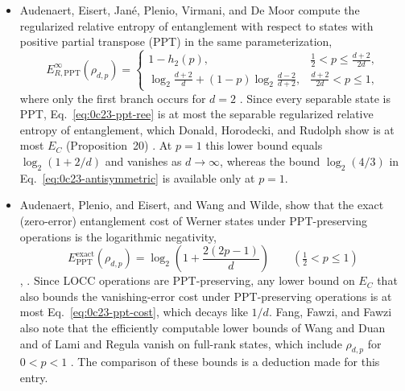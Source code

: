 \begin{itemize}
  \item Audenaert, Eisert, Jan\'e, Plenio, Virmani, and De Moor compute the
  regularized relative entropy of entanglement with respect to states with
  positive partial transpose (PPT) in the same parameterization,
  \begin{equation}
    E_{R,\mathrm{PPT}}^\infty(\rho_{d,p})=
    \begin{cases}
      1-h_2(p), & \frac12<p\leq\frac{d+2}{2d},\\[4pt]
      \log_2\frac{d+2}{d}+(1-p)\log_2\frac{d-2}{d+2},
        & \frac{d+2}{2d}<p\leq1,
    \end{cases}
    \label{eq:0c23-ppt-ree}
  \end{equation}
  where only the first branch occurs for $d=2$
  .  Since every separable state is
  PPT, Eq.~\eqref{eq:0c23-ppt-ree} is at most the separable regularized
  relative entropy of entanglement, which Donald, Horodecki, and Rudolph show
  is at most $E_C$ (Proposition~20)
  .  At $p=1$ this lower
  bound equals $\log_2(1+2/d)$ and vanishes as $d\to\infty$, whereas the bound
  $\log_2(4/3)$ in Eq.~\eqref{eq:0c23-antisymmetric} is available only at
  $p=1$.

  \item Audenaert, Plenio, and Eisert, and Wang and Wilde, show that the exact
  (zero-error) entanglement cost of Werner states under PPT-preserving
  operations is the logarithmic negativity,
  \begin{equation}
    E_{\mathrm{PPT}}^{\mathrm{exact}}(\rho_{d,p})
    =\log_2\!\left(1+\frac{2(2p-1)}{d}\right)
    \qquad\left(\tfrac12<p\leq1\right)
    \label{eq:0c23-ppt-cost}
  \end{equation}
  ,
  .  Since LOCC operations are
  PPT-preserving, any lower bound on $E_C$ that also bounds the vanishing-error
  cost under PPT-preserving operations is at most
  Eq.~\eqref{eq:0c23-ppt-cost}, which decays like $1/d$.  Fang, Fawzi, and
  Fawzi also note that the efficiently computable lower bounds of Wang and
  Duan and of Lami and Regula vanish on full-rank states, which include
  $\rho_{d,p}$ for $0<p<1$ .  The
  comparison of these bounds is a deduction made for this entry.


\end{itemize}
